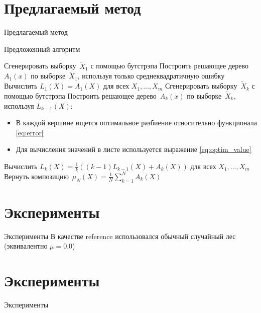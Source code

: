 \documentclass[10pt,pdf,hyperref={unicode}]{beamer}
\begin{document}
\section{Предлагаемый метод}
\begin{frame}{Предлагаемый метод}
\begin{algorithm}[H]
\caption{Предложенный алгоритм}
    \begin{algorithmic}[1]
      \STATE Сгенерировать выборку~$\tilde X_1$ с помощью бутстрэпа
      \STATE Построить решающее дерево~$A_1(x)$ по выборке~$\tilde X_1$, используя только среднеквадратичную ошибку
      \STATE Вычислить $L_1(X) = A_1(X)$ для всех $X_1, \dots, X_m$
            \STATE Сгенерировать выборку~$\tilde X_k$ с помощью бутстрэпа
            \STATE Построить решающее дерево~$A_k(x)$ по выборке~$\tilde X_k$, используя $L_{k-1}(X)$:
                \begin{itemize}
                    \item В каждой вершине ищется оптимальное разбиение относительно функционала \eqref{eq:error}
                    \item Для вычисления значений в листе используется выражение \eqref{eq:optim_value}
                \end{itemize}
              
            \STATE Вычислить $L_{k}(X) = \frac{1}{k} ((k-1)L_{k-1}(X) + A_k(X))$ для всех $X_1, \dots, X_m$
        \ENDFOR
        \STATE Вернуть композицию~$\mu_N(X) = \frac{1}{N} \sum_{k = 1}^{N} A_k(X)$
    \end{algorithmic}
\end{algorithm}
\end{frame}

\section{Эксперименты}
\begin{frame}{Эксперименты}
\justifying
В качестве reference использовался обычный случайный лес (эквивалентно $\mu=0.0$)
\begin{figure}[h]
  \centering
  
  
\end{figure}
\end{frame}

\section{Эксперименты}
\begin{frame}{Эксперименты}
\justifying
\begin{figure}[h]
  \centering
  
  
\end{figure}
\end{frame}
\end{document}
